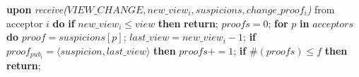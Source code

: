 \begin{algorithm}
\begin{algorithmic}[1]
		\State\textbf{upon} \textit{receive($VIEW\_CHANGE, new\_view_i, suspicions, change\_proof_i$)} from acceptor $i$ \textbf{do} 
		\State\hspace{\algorithmicindent} \textbf{if} $new\_view_i \leq view$ \textbf{then}
		\State\hspace{\algorithmicindent}\hspace{\algorithmicindent}\textbf{return};
		\State
		\State\hspace{\algorithmicindent} $proofs = 0$;
		\State\hspace{\algorithmicindent} \textbf{for} $p$ \textbf{in} $acceptors$ \textbf{do} 
		\State\hspace{\algorithmicindent}\hspace{\algorithmicindent} $proof = suspicions[p]$;
		\State\hspace{\algorithmicindent}\hspace{\algorithmicindent} $last\_view = new\_view_i-1$;
		\State\hspace{\algorithmicindent}\hspace{\algorithmicindent} \textbf{if} $proof_{pub_i} = \langle suspicion, last\_view \rangle$ \textbf{then}
		\State\hspace{\algorithmicindent}\hspace{\algorithmicindent}\hspace{\algorithmicindent} $proofs \mathrel{+{=}} 1$;
		\State
		\State\hspace{\algorithmicindent} \textbf{if} $\#(proofs) \leq f$ \textbf{then}
		\State\hspace{\algorithmicindent}\hspace{\algorithmicindent} \textbf{return};
		

\end{algorithmic}
\end{algorithm}
